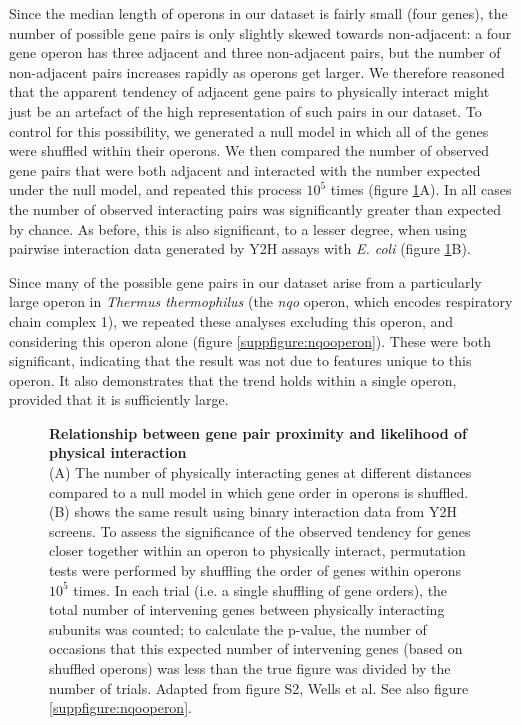 \documentclass[a4paper,11pt,twoside,openright]{scrbook}
\begin{document}
Since the median length of operons in our dataset is fairly small (four genes),
the number of possible gene pairs is only slightly skewed towards non-adjacent:
a four gene operon has three adjacent and three non-adjacent pairs, but the
number of non-adjacent pairs increases rapidly as operons get larger. We
therefore reasoned that the apparent tendency of adjacent gene pairs to
physically interact might just be an artefact of the high representation of such
pairs in our dataset. To control for this possibility, we generated a null model
in which all of the genes were shuffled within their operons. We then compared
the number of observed gene pairs that were both adjacent and interacted with
the number expected under the null model, and repeated this process \(10^{5}\)
times (figure \ref{figure:interveningcontrol}A). In all cases the number of
observed interacting pairs was significantly greater than expected by chance. As
before, this is also significant, to a lesser degree, when using pairwise
interaction data generated by Y2H assays with \textit{E. coli} (figure
\ref{figure:interveningcontrol}B).

Since many of the possible gene pairs in our dataset arise from a particularly
large operon in \textit{Thermus thermophilus} (the \textit{nqo} operon, which
encodes respiratory chain complex 1), we repeated these analyses excluding this
operon, and considering this operon alone (figure \ref{suppfigure:nqooperon}).
These were both significant, indicating that the result was not due to features
unique to this operon. It also demonstrates that the trend holds within a single
operon, provided that it is sufficiently large.

\begin{figure}[h]
    \caption[Relationship between gene pair proximity and likelihood of physical
    interaction]{\sffamily \textbf{Relationship between gene pair proximity and
    likelihood of physical interaction} \\ \small (A) The number of physically
    interacting genes at different distances compared to a null model in which
    gene order in operons is shuffled. (B) shows the same result using binary
    interaction data from Y2H screens\cite{Rajagopala2014}. To assess the
    significance of the observed tendency for genes closer together within an
    operon to physically interact, permutation tests were performed by shuffling
    the order of genes within operons $10^{5}$ times. In each trial (i.e. a
    single shuffling of gene orders), the total number of intervening genes
    between physically interacting subunits was counted; to calculate the
    p-value, the number of occasions that this expected number of intervening
    genes (based on shuffled operons) was less than the true figure was divided
    by the number of trials. Adapted from figure S2, Wells et al.
    \cite{Wells2016} See also figure \ref{suppfigure:nqooperon}.}
    \label{figure:interveningcontrol}
\end{figure}
\end{document}
